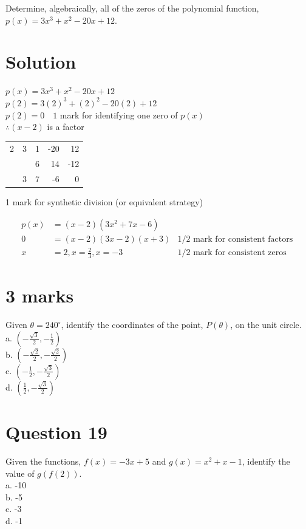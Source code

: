 \documentclass[10pt]{article}
\begin{document}
Determine, algebraically, all of the zeros of the polynomial function, $p(x)=3 x^{3}+x^{2}-20 x+12$.

\section*{Solution}
$p(x)=3 x^{3}+x^{2}-20 x+12$\\
$p(2)=3(2)^{3}+(2)^{2}-20(2)+12$\\
$p(2)=0 \quad 1$ mark for identifying one zero of $p(x)$\\
$\therefore(x-2)$ is a factor

\begin{center}
\begin{tabular}{r|rrrr}
2 & 3 & 1 & -20 & 12 \\
 &  & 6 & 14 & -12 \\
\hline
 & 3 & 7 & -6 & 0 \\
\hline
\end{tabular}
\end{center}

1 mark for synthetic division (or equivalent strategy)

$$
\begin{array}{rlr}
p(x) & =(x-2)\left(3 x^{2}+7 x-6\right) & \\
0 & =(x-2)(3 x-2)(x+3) & 1 / 2 \text { mark for consistent factors } \\
x & =2, x=\frac{2}{3}, x=-3 & 1 / 2 \text { mark for consistent zeros }
\end{array}
$$

\section*{3 marks}
Given $\theta=240^{\circ}$, identify the coordinates of the point, $P(\theta)$, on the unit circle.\\
a. $\left(-\frac{\sqrt{3}}{2},-\frac{1}{2}\right)$\\
b. $\left(-\frac{\sqrt{2}}{2},-\frac{\sqrt{2}}{2}\right)$\\
c. $\left(-\frac{1}{2},-\frac{\sqrt{3}}{2}\right)$\\
d. $\left(\frac{1}{2},-\frac{\sqrt{3}}{2}\right)$

\section*{Question 19}
Given the functions, $f(x)=-3 x+5$ and $g(x)=x^{2}+x-1$, identify the value of $g(f(2))$.\\
a. -10\\
b. -5\\
c. -3\\
d. -1
\end{document}
